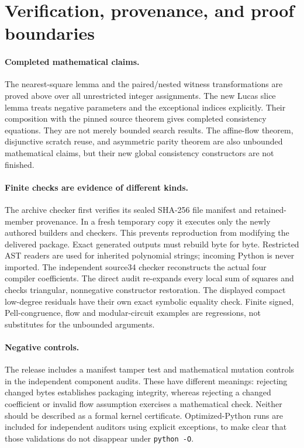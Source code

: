 \section{Verification, provenance, and proof boundaries}
\paragraph{Completed mathematical claims.}
The nearest-square lemma and the paired/nested witness transformations
are proved above over all unrestricted integer assignments. The new
Lucas slice lemma treats negative parameters and the exceptional
indices explicitly. Their composition with the pinned source theorem
gives completed consistency equations. They are not merely bounded
search results. The affine-flow theorem, disjunctive scratch reuse,
and asymmetric parity theorem are also unbounded mathematical claims,
but their new global consistency constructors are not finished.

\paragraph{Finite checks are evidence of different kinds.}
The archive checker first verifies its sealed SHA-256 file manifest and
retained-member provenance. In a fresh temporary copy it executes only
the newly authored builders and checkers. This prevents reproduction
from modifying the delivered package. Exact generated outputs must
rebuild byte for byte. Restricted AST readers are used for inherited
polynomial strings; incoming Python is never imported. The independent
source34 checker reconstructs the actual four compiler coefficients.
The direct audit re-expands every local sum of squares and checks
triangular, nonnegative constructor restoration. The displayed compact
low-degree residuals have their own exact symbolic equality check.
Finite signed, Pell-congruence, flow and modular-circuit examples are
regressions, not substitutes for the unbounded arguments.

\paragraph{Negative controls.}
The release includes a manifest tamper test and mathematical mutation
controls in the independent component audits. These have different
meanings: rejecting changed bytes establishes packaging integrity,
whereas rejecting a changed coefficient or invalid flow assumption
exercises a mathematical check. Neither should be described as a
formal kernel certificate. Optimized-Python runs are included for
independent auditors using explicit exceptions, to make clear that
those validations do not disappear under \texttt{python -O}.

